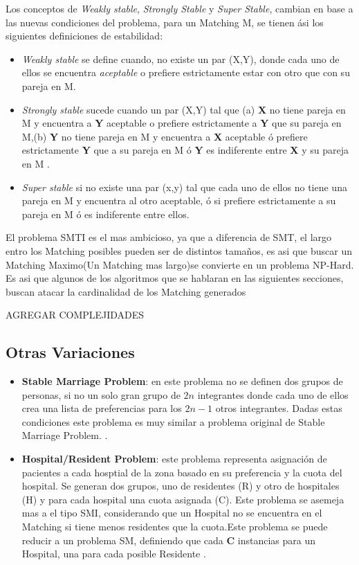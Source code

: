 \documentclass[letter, 10pt]{article}
\begin{document}
\indent Los conceptos de \textit{Weakly stable}, \textit{Strongly Stable} y \textit{Super Stable}, cambian
en base a las nuevas condiciones del problema, para un Matching M, se tienen \'asi los siguientes definiciones de estabilidad:

\begin{itemize}
\item \textit{Weakly stable} se define cuando, no existe un par (X,Y), donde cada uno de ellos se encuentra 
\textit{aceptable} o prefiere estrictamente estar con otro que con su pareja en M.

\item \textit{Strongly stable} sucede cuando un par (X,Y) tal que (a) \textbf{X} no tiene pareja en M y encuentra a \textbf{Y} aceptable o prefiere estrictamente a \textbf{Y} que su pareja en M,(b) \textbf{Y} no tiene pareja en M y encuentra a
\textbf{X} aceptable \'o prefiere estrictamente \textbf{Y} que a su pareja en M \'o \textbf{Y} es indiferente entre
\textbf{X} y su pareja en M .

\item \textit{Super stable} si no existe una par (x,y) tal que cada uno de ellos no tiene una pareja en M y encuentra al otro 
aceptable, \'o si prefiere estrictamente a su pareja en M \'o es indiferente entre ellos.\cite{ThesisPodhradsky10}
\end{itemize}

El problema SMTI es el mas ambicioso, ya que a diferencia de SMT, el largo entro los Matching posibles pueden ser de distintos tama\~nos, es asi que buscar un Matching Maximo(Un Matching mas largo)se convierte en un problema NP-Hard.
Es asi que algunos de los algoritmos que se hablaran en las siguientes secciones, buscan atacar la cardinalidad de los Matching
generados

AGREGAR COMPLEJIDADES

\subsection{Otras Variaciones}
\begin{itemize}
\item \textbf{Stable Marriage Problem}: en este problema no se definen dos grupos de personas, si no un solo gran grupo de $2n$ integrantes
donde cada uno de ellos crea una lista de preferencias para los $2n-1$ otros integrantes. Dadas estas condiciones este problema es 
muy similar a problema original de Stable Marriage Problem. \cite{IwamaMiyazaki08Survey}.
\item \textbf{Hospital/Resident Problem}: este problema representa asignaci\'on de pacientes a cada hosptial de la zona basado en su 
preferencia y la cuota del hospital. Se generan dos grupos, uno de residentes (R) y otro de hospitales (H) y para cada hospital una 
cuota asignada (C). Este problema se asemeja mas a el tipo SMI, considerando que un Hospital no se encuentra en el Matching si 
tiene menos residentes que la cuota.\indent Este problema se puede
reducir a un problema SM, definiendo que cada \textbf{C} instancias para un Hospital, una para cada posible Residente \cite{IwamaMiyazaki08Survey}.
\end{itemize}
\end{document}
